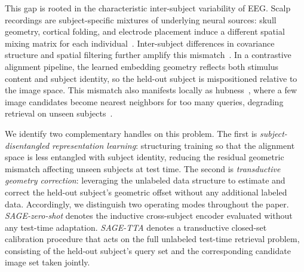 \documentclass{article}
\begin{document}
This gap is rooted in the characteristic inter-subject variability of EEG. Scalp recordings are subject-specific mixtures of underlying neural sources: skull geometry, cortical folding, and electrode placement induce a different spatial mixing matrix for each individual~\cite{onton2006imaging}. Inter-subject differences in covariance structure and spatial filtering further amplify this mismatch~\cite{blankertz2008optimizing,barachant2010riemannian,samek2013transferring,haufe2014interpretation}. In a contrastive alignment pipeline, the learned embedding geometry reflects both stimulus content and subject identity, so the held-out subject is mispositioned relative to the image space. This mismatch also manifests locally as hubness~\cite{radovanovic2010hubs,dinu2015hubness}, where a few image candidates become nearest neighbors for too many queries, degrading retrieval on unseen subjects~\cite{huang2026sattc}.

We identify two complementary handles on this problem.
The first is \emph{subject-disentangled representation learning}: structuring training so that the alignment space is less entangled with subject identity, reducing the residual geometric mismatch affecting unseen subjects at test time.
The second is \emph{transductive geometry correction}: leveraging the unlabeled data structure to estimate and correct the held-out subject's geometric offset without any additional labeled data. Accordingly, we distinguish two operating modes throughout the paper. \emph{SAGE-zero-shot} denotes the inductive cross-subject encoder evaluated without any test-time adaptation. \emph{SAGE-TTA} denotes a transductive closed-set calibration procedure that acts on the full unlabeled test-time retrieval problem, consisting of the held-out subject's query set and the corresponding candidate image set taken jointly.
\end{document}
